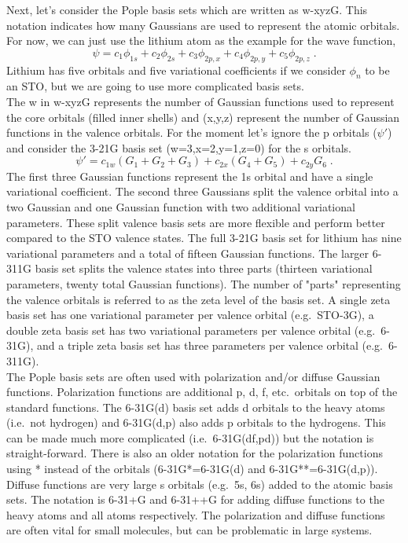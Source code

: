 \documentclass[12pt]{report}
\begin{document}
Next, let's consider the Pople basis sets which are written as w-xyzG.
This notation indicates how many Gaussians are used to represent the atomic
orbitals.
For now, we can just use the lithium atom as the example for the wave
function,
\begin{equation}
 \psi = c_1\phi_{1s} + c_2\phi_{2s} + c_3\phi_{2p,x} +
 c_4\phi_{2p,y} + c_5\phi_{2p,z} \; .
\end{equation}
Lithium has five orbitals and five variational coefficients if we consider
$\phi_n$ to be an STO, but we are going to use more complicated basis sets. \\

The w in w-xyzG represents the number of Gaussian functions used to represent
the core orbitals (filled inner shells) and (x,y,z) represent the number of
Gaussian functions in the valence orbitals.
For the moment let's ignore the p orbitals ($\psi'$) and consider the 3-21G
basis set (w=3,x=2,y=1,z=0) for the s orbitals.
\begin{equation}
 \psi' = c_{1w}(G_1+G_2+G_3)+c_{2x}(G_4+G_5)+c_{2y}G_6 \; .
\end{equation}
The first three Gaussian functions represent the 1s orbital and have a single
variational coefficient.
The second three Gaussians split the valence orbital into a two Gaussian and
one Gaussian function with two additional variational parameters.
These split valence basis sets are more flexible and perform better compared
to the STO valence states.
The full 3-21G basis set for lithium has nine variational parameters and a
total of fifteen Gaussian functions.
The larger 6-311G basis set splits the valence states into three parts
(thirteen variational parameters, twenty total Gaussian functions).
The number of "parts" representing the valence orbitals is referred to as the
zeta level of the basis set.
A single zeta basis set has one variational parameter per valence orbital
(e.g.\ STO-3G), a double zeta basis set has two variational parameters per
valence orbital (e.g.\ 6-31G), and a triple zeta basis set has three parameters
per valence orbital (e.g.\ 6-311G). \\

The Pople basis sets are often used with polarization and/or diffuse Gaussian
functions.
Polarization functions are additional p, d, f, etc.\ orbitals on top of the
standard functions.
The 6-31G(d) basis set adds d orbitals to the heavy atoms (i.e.\ not hydrogen)
and 6-31G(d,p) also adds p orbitals to the hydrogens.
This can be made much more complicated (i.e.\ 6-31G(df,pd)) but the notation is
straight-forward.
There is also an older notation for the polarization functions using * instead
of the orbitals (6-31G*=6-31G(d) and 6-31G**=6-31G(d,p)).
Diffuse functions are very large s orbitals (e.g.\ 5s, 6s) added to the atomic
basis sets.
The notation is 6-31+G and 6-31++G for adding diffuse functions to the heavy
atoms and all atoms respectively.
The polarization and diffuse functions are often vital for small molecules,
but can be problematic in large systems. \\
\end{document}

